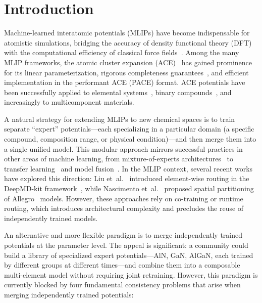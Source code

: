 \documentclass[twoside,prb,aps,floatfix,superscriptaddress,longbibliography]{revtex4-2}
\begin{document}
\maketitle

\section{Introduction}
\label{sec:intro}

Machine-learned interatomic potentials (MLIPs) have become indispensable for atomistic simulations, bridging the accuracy of density functional theory (DFT) with the computational efficiency of classical force fields~\cite{Shapeev2016MTP,Drautz2019ACE,Batatia2022MACE}. Among the many MLIP frameworks, the atomic cluster expansion (ACE)~\cite{Drautz2019ACE,Lysogorskiy2021PACE} has gained prominence for its linear parameterization, rigorous completeness guarantees~\cite{Dusson2022ACE}, and efficient implementation in the performant ACE (PACE) format. ACE potentials have been successfully applied to elemental systems~\cite{Kovacs2021Al,Byggmastar2020W}, binary compounds~\cite{Yang2024AlNACE}, and increasingly to multicomponent materials.

A natural strategy for extending MLIPs to new chemical spaces is to train separate ``expert'' potentials---each specializing in a particular domain (a specific compound, composition range, or physical condition)---and then merge them into a single unified model. This modular approach mirrors successful practices in other areas of machine learning, from mixture-of-experts architectures~\cite{Jacobs1991MoE,Shazeer2017MoE} to transfer learning~\cite{Pan2010Transfer} and model fusion~\cite{Matena2022Merging}. In the MLIP context, several recent works have explored this direction: Liu et~al.~\cite{Liu2026ScalingMoE} introduced element-wise routing in the DeepMD-kit framework~\cite{Wang2018DeepMD}, while Nascimento et~al.~\cite{Nascimento2026MoEFramework} proposed spatial partitioning of Allegro~\cite{Musaelian2023Allegro} models. However, these approaches rely on co-training or runtime routing, which introduces architectural complexity and precludes the reuse of independently trained models.

An alternative and more flexible paradigm is to merge independently trained potentials at the parameter level. The appeal is significant: a community could build a library of specialized expert potentials---AlN, GaN, AlGaN, each trained by different groups at different times---and combine them into a composable multi-element model without requiring joint retraining. However, this paradigm is currently blocked by four fundamental consistency problems that arise when merging independently trained potentials:
\end{document}
